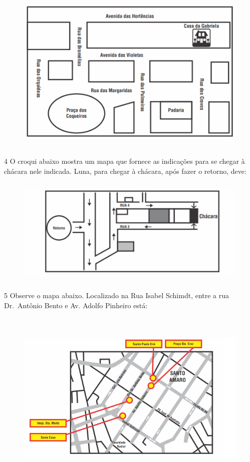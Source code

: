 \begin{figure}
\includegraphics[width=4.95347in,height=3.13958in]{./imgSAEB_6_MAT/media/image66.png}
\end{figure}


\num{4}  O croqui abaixo mostra um mapa que fornece as indicações para se
chegar à chácara nele indicada. Luna, para chegar à chácara, após fazer o retorno, deve:

\begin{figure}
\includegraphics[width=4.95347in,height=2.04653in]{./imgSAEB_6_MAT/media/image67.png}
\end{figure}


\num{5}  Observe o mapa abaixo. Localizado na Rua Isabel Schimdt, entre a rua Dr.~Antônio Bento e Av.
Adolfo Pinheiro está:

\begin{figure}
\includegraphics[width=5.90625in,height=3.34375in]{./imgSAEB_6_MAT/media/image68.png}
\end{figure}

